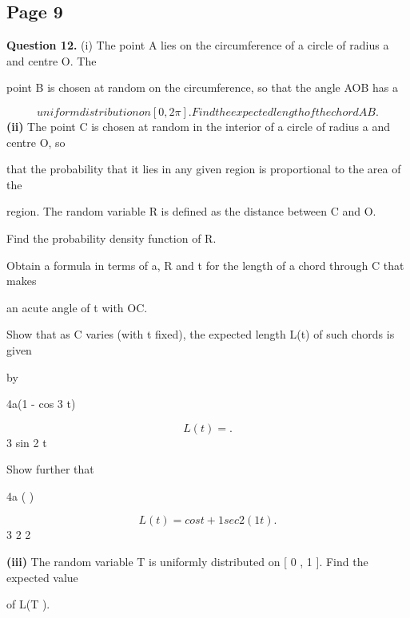 \documentclass[12pt]{article}
\begin{document}
\subsection*{Page 9}
\begin{flushleft}
\bigskip\textbf{Question 12.} (i) The point A lies on the circumference of a circle of radius a and centre O. The\par
point B is chosen at random on the circumference, so that the angle AOB has a\par
\[uniform distribution on [ 0 , 2\pi]. Find the expected length of the chord AB.\]
\textbf{(ii)} The point C is chosen at random in the interior of a circle of radius a and centre O, so\par
that the probability that it lies in any given region is proportional to the area of the\par
region. The random variable R is defined as the distance between C and O.\par
Find the probability density function of R.\par
Obtain a formula in terms of a, R and t for the length of a chord through C that makes\par
an acute angle of t with OC.\par
Show that as C varies (with t fixed), the expected length L(t) of such chords is given\par
by\par
4a(1 - cos 3 t)\par
\[L(t) = .\]
3 sin 2 t\par
Show further that\par
4a ( )\par
\[L(t) = cos t + 1 sec 2 ( 1 t) .\]
3 2 2\par
\textbf{(iii)} The random variable T is uniformly distributed on [ 0 , 1 \pi]. Find the expected value\par
of L(T ).\par
\end{flushleft}
\end{document}
